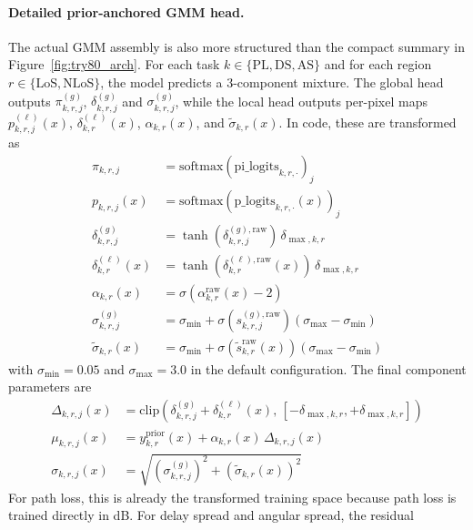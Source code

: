 \documentclass[11pt,a4paper]{article}
\begin{document}
\paragraph{Detailed prior-anchored GMM head.}
The actual GMM assembly is also more structured than the compact summary in
Figure~\ref{fig:try80_arch}. For each task
$k \in \{\mathrm{PL},\mathrm{DS},\mathrm{AS}\}$ and for each region
$r \in \{\mathrm{LoS},\mathrm{NLoS}\}$, the model predicts a 3-component
mixture. The global head outputs
$\pi^{(g)}_{k,r,j}$, $\delta^{(g)}_{k,r,j}$ and $\sigma^{(g)}_{k,r,j}$, while
the local head outputs per-pixel maps
$p^{(\ell)}_{k,r,j}(x)$, $\delta^{(\ell)}_{k,r}(x)$, $\alpha_{k,r}(x)$, and
$\tilde\sigma_{k,r}(x)$. In code, these are transformed as
\begin{align}
\pi_{k,r,j} &= \mathrm{softmax}\!\left(\mathrm{pi\_logits}_{k,r,\cdot}\right)_j \\
p_{k,r,j}(x) &= \mathrm{softmax}\!\left(\mathrm{p\_logits}_{k,r,\cdot}(x)\right)_j \\
\delta^{(g)}_{k,r,j} &= \tanh\!\left(\delta^{(g),\mathrm{raw}}_{k,r,j}\right)\,\delta_{\max,k,r} \\
\delta^{(\ell)}_{k,r}(x) &= \tanh\!\left(\delta^{(\ell),\mathrm{raw}}_{k,r}(x)\right)\,\delta_{\max,k,r} \\
\alpha_{k,r}(x) &= \sigma\!\left(\alpha^{\mathrm{raw}}_{k,r}(x) - 2\right) \\
\sigma^{(g)}_{k,r,j} &= \sigma_{\min} + \sigma\!\left(s^{(g),\mathrm{raw}}_{k,r,j}\right)\left(\sigma_{\max}-\sigma_{\min}\right) \\
\tilde\sigma_{k,r}(x) &= \sigma_{\min} + \sigma\!\left(\tilde s^{\mathrm{raw}}_{k,r}(x)\right)\left(\sigma_{\max}-\sigma_{\min}\right)
\end{align}
with $\sigma_{\min}=0.05$ and $\sigma_{\max}=3.0$ in the default
configuration. The final component parameters are
\begin{align}
\Delta_{k,r,j}(x) &= \mathrm{clip}\!\left(\delta^{(g)}_{k,r,j} + \delta^{(\ell)}_{k,r}(x),\,
[-\delta_{\max,k,r}, +\delta_{\max,k,r}]\right) \\
\mu_{k,r,j}(x) &= y^{\mathrm{prior}}_{k,r}(x) + \alpha_{k,r}(x)\,\Delta_{k,r,j}(x) \\
\sigma_{k,r,j}(x) &= \sqrt{\left(\sigma^{(g)}_{k,r,j}\right)^2 + \left(\tilde\sigma_{k,r}(x)\right)^2}
\label{eq:try80_sigma_detail}
\end{align}
For path loss, this is already the transformed training space because path loss
is trained directly in dB. For delay spread and angular spread, the residual
\end{document}
